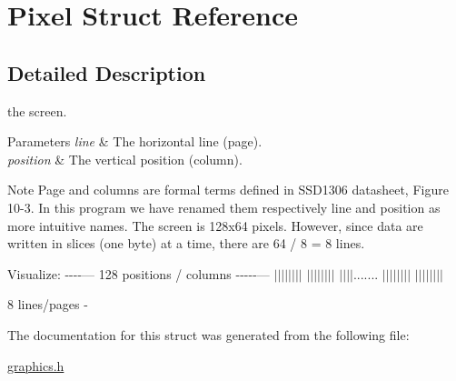 \hypertarget{structPixel}{}\section{Pixel Struct Reference}
\label{structPixel}


\subsection{Detailed Description}
the screen. 
\begin{DoxyParams}{Parameters}
{\em line} & The horizontal line (page). \\
\hline
{\em position} & The vertical position (column). \\
\hline
\end{DoxyParams}
\begin{DoxyNote}{Note}
Page and columns are formal terms defined in S\+S\+D1306 datasheet, Figure 10-\/3. In this program we have renamed them respectively line and position as more intuitive names. The screen is 128x64 pixels. However, since data are written in slices (one byte) at a time, there are 64 / 8 = 8 lines.
\end{DoxyNote}
Visualize\+: -\/-\/-\/-\/--- 128 positions / columns -\/-\/-\/-\/-\/--- $\vert$$\vert$$\vert$$\vert$$\vert$$\vert$$\vert$$\vert$ $\vert$$\vert$$\vert$$\vert$$\vert$$\vert$$\vert$$\vert$ $\vert$$\vert$$\vert$$\vert$....... $\vert$$\vert$$\vert$$\vert$$\vert$$\vert$$\vert$$\vert$ $\vert$$\vert$$\vert$$\vert$$\vert$$\vert$$\vert$$\vert$
\begin{DoxyItemize}
\item 
\item 
\item 8 lines/pages -\/
\item 
\item 
\item 
\item 
\end{DoxyItemize}

The documentation for this struct was generated from the following file\+:\begin{DoxyCompactItemize}
\item 
\hyperlink{graphics_8h}{graphics.\+h}\end{DoxyCompactItemize}

